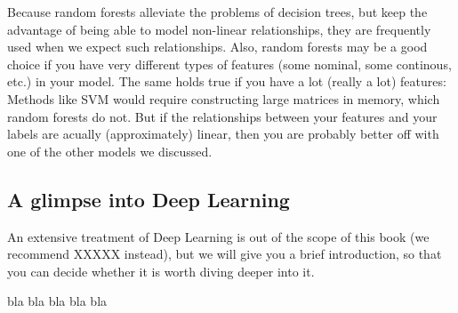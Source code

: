 Because random forests alleviate the problems of decision trees, but keep the advantage of being able to model non-linear relationships, they are frequently used when we expect such relationships.
Also, random forests may be a good choice if you have very different types of features (some nominal, some continous, etc.) in your model. The same holds true if you have a lot (really a lot) features: Methods like SVM would require constructing large matrices in memory, which random forests do not.
But if the relationships between your features and your labels are acually (approximately) linear, then you are probably better off with one of the other models we discussed.




\subsection{A glimpse into Deep Learning} 

An extensive treatment of Deep Learning is out of the scope of this book (we recommend XXXXX instead), but we will give you a brief introduction, so that you can decide whether it is worth diving deeper into it.

bla
bla
bla
bla
bla

